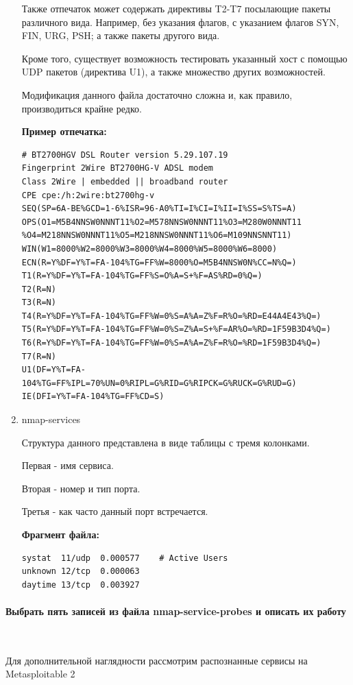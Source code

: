 \documentclass{article}
\begin{document}
\begin{enumerate}
Также отпечаток может содержать директивы T2-T7 посылающие пакеты различного вида. Например, без указания флагов, с указанием флагов SYN, FIN, URG, PSH; а также пакеты другого вида. 

Кроме того, существует возможность тестировать указанный хост с помощью UDP пакетов (директива U1), а также множество других возможностей.

Модификация данного файла достаточно сложна и, как правило, производиться крайне редко.

\textbf{Пример отпечатка:}
\begin{verbatim}
# BT2700HGV DSL Router version 5.29.107.19
Fingerprint 2Wire BT2700HG-V ADSL modem
Class 2Wire | embedded || broadband router
CPE cpe:/h:2wire:bt2700hg-v
SEQ(SP=6A-BE%GCD=1-6%ISR=96-A0%TI=I%CI=I%II=I%SS=S%TS=A)
OPS(O1=M5B4NNSW0NNNT11%O2=M578NNSW0NNNT11%O3=M280W0NNNT11
%O4=M218NNSW0NNNT11%O5=M218NNSW0NNNT11%O6=M109NNSNNT11)
WIN(W1=8000%W2=8000%W3=8000%W4=8000%W5=8000%W6=8000)
ECN(R=Y%DF=Y%T=FA-104%TG=FF%W=8000%O=M5B4NNSW0N%CC=N%Q=)
T1(R=Y%DF=Y%T=FA-104%TG=FF%S=O%A=S+%F=AS%RD=0%Q=)
T2(R=N)
T3(R=N)
T4(R=Y%DF=Y%T=FA-104%TG=FF%W=0%S=A%A=Z%F=R%O=%RD=E44A4E43%Q=)
T5(R=Y%DF=Y%T=FA-104%TG=FF%W=0%S=Z%A=S+%F=AR%O=%RD=1F59B3D4%Q=)
T6(R=Y%DF=Y%T=FA-104%TG=FF%W=0%S=A%A=Z%F=R%O=%RD=1F59B3D4%Q=)
T7(R=N)
U1(DF=Y%T=FA-104%TG=FF%IPL=70%UN=0%RIPL=G%RID=G%RIPCK=G%RUCK=G%RUD=G)
IE(DFI=Y%T=FA-104%TG=FF%CD=S)
\end{verbatim}

\item nmap-services

Структура данного представлена в виде таблицы с тремя колонками.

Первая - имя сервиса.

Вторая - номер и тип порта.

Третья - как часто данный порт встречается.

\textbf{Фрагмент файла:}
\begin{verbatim}
systat	11/udp	0.000577	# Active Users
unknown	12/tcp	0.000063
daytime	13/tcp	0.003927
\end{verbatim}

\end{enumerate}

\paragraph{Выбрать пять записей из файла nmap-service-probes и описать их работу}
~

Для дополнительной наглядности рассмотрим распознанные сервисы на Metasploitable 2
\end{document}

